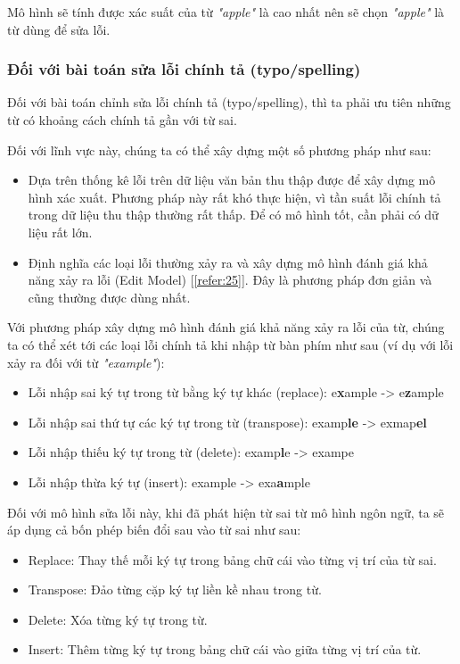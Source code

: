 Mô hình sẽ tính được xác suất của từ \textit{"apple"} là cao nhất nên sẽ chọn \textit{"apple"} là từ dùng để sửa lỗi.

\subsubsection{Đối với bài toán sửa lỗi chính tả (typo/spelling)} \label{subsec3}
Đối với bài toán chỉnh sửa lỗi chính tả (typo/spelling), thì ta phải ưu tiên những từ có khoảng cách chính tả gần với từ sai.

Đối với lĩnh vực này, chúng ta có thể xây dựng một số phương pháp như sau:
\begin{itemize}
    \item Dựa trên thống kê lỗi trên dữ liệu văn bản thu thập được để xây dựng mô hình xác xuất. Phương pháp này rất khó thực hiện, vì tần suất lỗi chính tả trong dữ liệu thu thập thường rất thấp. Để có mô hình tốt, cần phải có dữ liệu rất lớn.
    \item Định nghĩa các loại lỗi thường xảy ra và xây dựng mô hình đánh giá khả năng xảy ra lỗi (Edit Model) [\ref{refer:25}]. Đây là phương pháp đơn giản và cũng thường được dùng nhất.
\end{itemize}

Với phương pháp xây dựng mô hình đánh giá khả năng xảy ra lỗi của từ, chúng ta có thể xét tới các loại lỗi chính tả khi nhập từ bàn phím như sau (ví dụ với lỗi xảy ra đối với từ \textit{"example"}):
\begin{itemize}
    \item Lỗi nhập sai ký tự trong từ bằng ký tự khác (replace): e\textbf{x}ample -> e\textbf{z}ample
    \item Lỗi nhập sai thứ tự các ký tự trong từ (transpose): examp\textbf{le} -> exmap\textbf{el}
    \item Lỗi nhập thiếu ký tự trong từ (delete): examp\textbf{l}e -> exampe
    \item Lỗi nhập thừa ký tự (insert): example -> exa\textbf{a}mple
\end{itemize}

Đối với mô hình sửa lỗi này, khi đã phát hiện từ sai từ mô hình ngôn ngữ, ta sẽ áp dụng cả bốn phép biến đổi sau vào từ sai như sau:
\begin{itemize}
    \item Replace: Thay thế mỗi ký tự trong bảng chữ cái vào từng vị trí của từ sai.
    \item Transpose: Đảo từng cặp ký tự liền kề nhau trong từ.
    \item Delete: Xóa từng ký tự trong từ.
    \item Insert: Thêm từng ký tự trong bảng chữ cái vào giữa từng vị trí của từ.
\end{itemize}

